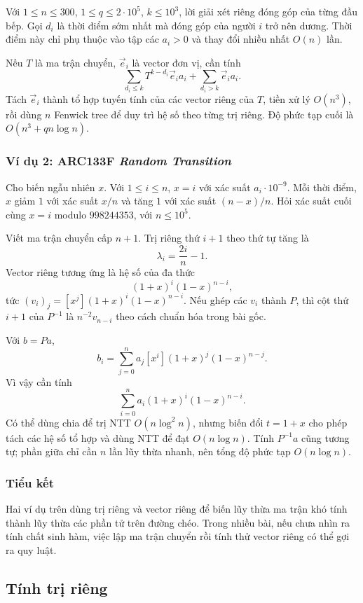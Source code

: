 \documentclass[11pt]{article}
\begin{document}
Với \(1\le n\le 300\), \(1\le q\le 2\cdot 10^5\), \(k\le 10^3\), lời giải xét
riêng đóng góp của từng đầu bếp. Gọi \(d_i\) là thời điểm sớm nhất mà đóng góp
của người \(i\) trở nên dương. Thời điểm này chỉ phụ thuộc vào tập các \(a_i>0\)
và thay đổi nhiều nhất \(O(n)\) lần.

Nếu \(T\) là ma trận chuyển, \(\vec e_i\) là vector đơn vị, cần tính
\[
  \sum_{d_i\le k}T^{k-d_i}\vec e_i a_i+\sum_{d_i>k}\vec e_i a_i.
\]
Tách \(\vec e_i\) thành tổ hợp tuyến tính của các vector riêng của \(T\), tiền
xử lý \(O(n^3)\), rồi dùng \(n\) Fenwick tree để duy trì hệ số theo từng trị
riêng. Độ phức tạp cuối là \(O(n^3+qn\log n)\).

\subsubsection{Ví dụ 2: ARC133F \emph{Random Transition}}

Cho biến ngẫu nhiên \(x\). Với \(1\le i\le n\), \(x=i\) với xác suất
\(a_i\cdot 10^{-9}\). Mỗi thời điểm, \(x\) giảm \(1\) với xác suất \(x/n\) và
tăng \(1\) với xác suất \((n-x)/n\). Hỏi xác suất cuối cùng \(x=i\) modulo
\(998244353\), với \(n\le 10^5\).

Viết ma trận chuyển cấp \(n+1\). Trị riêng thứ \(i+1\) theo thứ tự tăng là
\[
  \lambda_i=\frac{2i}{n}-1.
\]
Vector riêng tương ứng là hệ số của đa thức
\[
  (1+x)^i(1-x)^{n-i},
\]
tức \((v_i)_j=[x^j](1+x)^i(1-x)^{n-i}\). Nếu ghép các \(v_i\) thành \(P\), thì
cột thứ \(i+1\) của \(P^{-1}\) là \(n^{-2}v_{n-i}\) theo cách chuẩn hóa trong
bài gốc.

Với \(b=Pa\),
\[
  b_i=\sum_{j=0}^n a_j[x^i](1+x)^j(1-x)^{n-j}.
\]
Vì vậy cần tính
\[
  \sum_{i=0}^n a_i(1+x)^i(1-x)^{n-i}.
\]
Có thể dùng chia để trị NTT \(O(n\log^2 n)\), nhưng biến đổi \(t=1+x\) cho phép
tách các hệ số tổ hợp và dùng NTT để đạt \(O(n\log n)\). Tính \(P^{-1}a\) cũng
tương tự; phần giữa chỉ cần \(n\) lần lũy thừa nhanh, nên tổng độ phức tạp
\(O(n\log n)\).

\subsubsection{Tiểu kết}

Hai ví dụ trên dùng trị riêng và vector riêng để biến lũy thừa ma trận khó
tính thành lũy thừa các phần tử trên đường chéo. Trong nhiều bài, nếu chưa nhìn
ra tính chất sinh hàm, việc lập ma trận chuyển rồi tính thử vector riêng có thể
gợi ra quy luật.

\subsection{Tính trị riêng}
\end{document}
